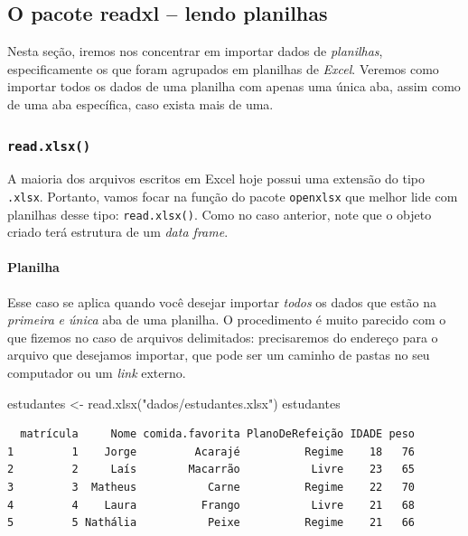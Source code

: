 \documentclass[
  letterpaper,
  DIV=11,
  numbers=noendperiod]{scrreprt}
\let\oldparagraph\paragraph
\renewcommand{\paragraph}[1]{\oldparagraph{#1}\mbox{}}
\newenvironment{Shaded}{\begin{snugshade}}{\end{snugshade}}
\newcommand{\FunctionTok}[1]{\textcolor[rgb]{0.28,0.35,0.67}{#1}}
\newcommand{\NormalTok}[1]{\textcolor[rgb]{0.00,0.23,0.31}{#1}}
\newcommand{\OtherTok}[1]{\textcolor[rgb]{0.00,0.23,0.31}{#1}}
\newcommand{\StringTok}[1]{\textcolor[rgb]{0.13,0.47,0.30}{#1}}
\begin{document}
\subsection{O pacote readxl -- lendo
planilhas}\label{o-pacote-readxl-lendo-planilhas}

Nesta seção, iremos nos concentrar em importar dados de
\emph{planilhas}, especificamente os que foram agrupados em planilhas de
\emph{Excel}. Veremos como importar todos os dados de uma planilha com
apenas uma única aba, assim como de uma aba específica, caso exista mais
de uma.

\subsubsection{\texorpdfstring{\texttt{read.xlsx()}}{read.xlsx()}}\label{read.xlsx}

A maioria dos arquivos escritos em Excel hoje possui uma extensão do
tipo \texttt{.xlsx}. Portanto, vamos focar na função do pacote
\texttt{openxlsx} que melhor lide com planilhas desse tipo:
\texttt{read.xlsx()}. Como no caso anterior, note que o objeto criado
terá estrutura de um \emph{data frame}.

\paragraph{Planilha}\label{planilha}

Esse caso se aplica quando você desejar importar \emph{todos} os dados
que estão na \emph{primeira} \emph{e única} aba de uma planilha. O
procedimento é muito parecido com o que fizemos no caso de arquivos
delimitados: precisaremos do endereço para o arquivo que desejamos
importar, que pode ser um caminho de pastas no seu computador ou um
\emph{link} externo.

\begin{Shaded}
\begin{Highlighting}[]
\NormalTok{estudantes }\OtherTok{\textless{}{-}} \FunctionTok{read.xlsx}\NormalTok{(}\StringTok{"dados/estudantes.xlsx"}\NormalTok{)}
\NormalTok{estudantes}
\end{Highlighting}
\end{Shaded}

\begin{verbatim}
  matrícula     Nome comida.favorita PlanoDeRefeição IDADE peso
1         1    Jorge         Acarajé          Regime    18   76
2         2     Laís        Macarrão           Livre    23   65
3         3  Matheus           Carne          Regime    22   70
4         4    Laura          Frango           Livre    21   68
5         5 Nathália           Peixe          Regime    21   66
\end{verbatim}
\end{document}
